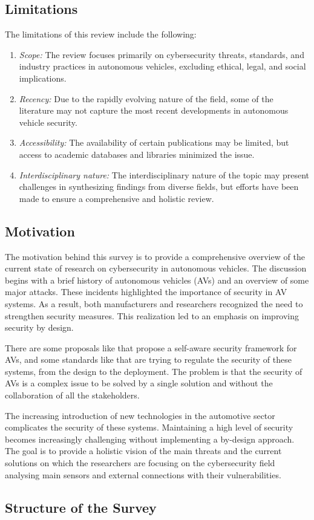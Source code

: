 \subsection{Limitations}\label{subsec:limitations}

The limitations of this review include the following:
\begin{enumerate}
    \item \textit{Scope:} The review focuses primarily on cybersecurity threats, standards, and industry practices in autonomous vehicles, excluding ethical, legal, and social implications.
    \item \textit{Recency:} Due to the rapidly evolving nature of the field, some of the literature may not capture the most recent developments in autonomous vehicle security.
    \item \textit{Accessibility:} The availability of certain publications may be limited, but access to academic databases and libraries minimized the issue.
    \item \textit{Interdisciplinary nature:} The interdisciplinary nature of the topic may present challenges in synthesizing findings from diverse fields, but efforts have been made to ensure a comprehensive and holistic review.
\end{enumerate}

\subsection{Motivation}\label{subsec:motivation}

The motivation behind this survey is to provide a comprehensive overview of the current state of research on cybersecurity in autonomous vehicles.
The discussion begins with a brief history of autonomous vehicles (AVs) and an overview of some major attacks.
These incidents highlighted the importance of security in AV systems.
As a result, both manufacturers and researchers recognized the need to strengthen security measures.
This realization led to an emphasis on improving security by design.

There are some proposals like\cite{adu-kyere2023self-aware} that propose a self-aware security framework for AVs, and some standards like\cite{comparison-standard} that are trying to regulate the security of these systems, from the design to the deployment.
The problem is that the security of AVs is a complex issue to be solved by a single solution and without the collaboration of all the stakeholders.

The increasing introduction of new technologies in the automotive sector complicates the security of these systems.
Maintaining a high level of security becomes increasingly challenging without implementing a by-design approach.
The goal is to provide a holistic vision of the main threats and the current solutions on which the researchers are focusing on the cybersecurity field analysing main sensors and external connections with their vulnerabilities.

\subsection{Structure of the Survey}\label{subsec:structure-of-the-survey}

\newpage
